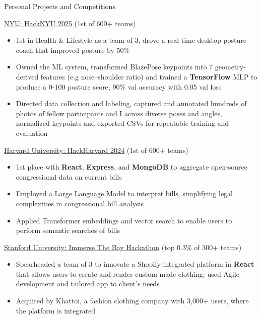 \documentclass{article}
\newlength{\tabin}
\newlength{\secsep}
\newcommand{\lineunder}{\vspace*{-8pt} \\ \hspace*{-6pt} \hrulefill \\ \vspace*{-15pt}}
\newenvironment{tabbedsection}[1]{
  \begin{list}{}{
      \setlength{\itemsep}{0pt}
      \setlength{\labelsep}{0pt}
      \setlength{\labelwidth}{0pt}
      \setlength{\leftmargin}{\tabin}
      \setlength{\rightmargin}{\tabin}
      \setlength{\listparindent}{0pt}
      \setlength{\parsep}{0pt}
      \setlength{\parskip}{0pt}
      \setlength{\partopsep}{0pt}
      \setlength{\topsep}{#1}
    }
  \item[]
}{\end{list}}
\newenvironment{resume_section}[1]{
  \filbreak
  \vspace{2\secsep}
  \textsc{\large#1}
  \lineunder
  \begin{tabbedsection}{\secsep}
}{\end{tabbedsection}}
\newenvironment{resume_subsection}[2][]{
  \textbf{#2} \hfill {\footnotesize #1} \hspace{-3em}
  \begin{tabbedsection}{0.5\secsep}
}{\end{tabbedsection}}
\newenvironment{subitems}{
  \renewcommand{\labelitemi}{-}
  \begin{itemize}
      \setlength{\labelsep}{1em}
      \fontsize{10.4pt}{11pt}\selectfont
}{\end{itemize}}
\begin{document}
\begin{resume_section}{Personal Projects and Competitions}

    \begin{resume_subsection}[(February 2025)]{\href{https://devpost.com/software/zenposture}{NYU: HackNYU 2025} (1st of 600+ teams)}
    \begin{subitems}
        \item 1st in Health \& Lifestyle as a team of 3, drove a real-time desktop posture coach that improved posture by 50\%
        \item Owned the ML system, transformed BlazePose keypoints into 7 geometry-derived features (e.g nose–shoulder ratio) and trained a \textbf{TensorFlow} MLP to produce a 0-100 posture score, 90\% val accuracy with 0.05 val loss
        \item Directed data collection and labeling, captured and annotated hundreds of photos of fellow participants and I across diverse poses and angles, normalized keypoints and exported CSVs for repeatable training and evaluation
    \end{subitems}
    \end{resume_subsection}
    \begin{resume_subsection}[(October 2024)]{\href{https://devpost.com/software/openlegislation}{Harvard University: HackHarvard 2024} (1st of 600+ teams)}
        \begin{subitems}
            \item 1st place with \textbf{React}, \textbf{Express}, and \textbf{MongoDB} to aggregate open-source congressional data on current bills
            \item Employed a Large Language Model to interpret bills, simplifying legal complexities in congressional bill analysis
            \item Applied Transformer embeddings and vector search to enable users to perform semantic searches of bills
        \end{subitems}
    \end{resume_subsection}
    
    \begin{resume_subsection}[(November 2023)]{\href{https://devpost.com/software/project-aphrodite}{Stanford University: Immerse The Bay Hackathon} (top 0.3\%  of 300+ teams)}
    \begin{subitems}
        \item Spearheaded a team of 3 to innovate a Shopify-integrated platform in \textbf{React} that allows users to create and render custom-made clothing; used Agile development and tailored app to client's needs
        \item Acquired by Khattoi, a fashion clothing company with 3,000+ users, where the platform is integrated
    \end{subitems}
    \end{resume_subsection}


\end{resume_section}
\end{document}
